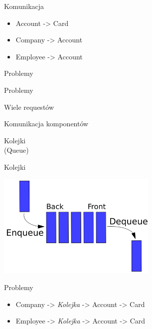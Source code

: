 \documentclass{beamer}
\begin{document}
\begin{frame}{Komunikacja}
	\begin{huge}
		\begin{itemize}[<+->]
			\item Account -> Card
			\item Company -> Account
			\item Employee -> Account
		\end{itemize}
	\end{huge}
\end{frame}

\begin{frame}{}
	\begin{center}
		\Huge{Problemy}
	\end{center}
\end{frame}

\begin{frame}{Problemy}
	\begin{center}
		\Huge{Wiele requestów}
	\end{center}
\end{frame}

\begin{frame}{Komunikacja komponentów}
	\begin{center}
		\Huge{Kolejki}\\
		\huge{(Queue)}
	\end{center}
\end{frame}

\begin{frame}{Kolejki}
	\begin{center}
		\includegraphics[height=5cm]{queue1.png}
	\end{center}
\end{frame}

\begin{frame}{Problemy}
	\begin{huge}
		\begin{itemize}[<+->]
			\item Company -> \textit{Kolejka} -> Account -> Card
			\item Employee -> \textit{Kolejka} -> Account -> Card
		\end{itemize}
	\end{huge}
\end{frame}
\end{document}
